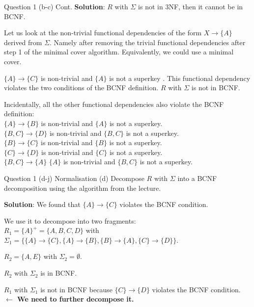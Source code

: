 \begin{frame}[fragile]{Question 1 (b-c) Cont.}
\textbf{Solution}:
$R$ with $\Sigma$ is not in 3NF, then it cannot be in BCNF.\\\vspace{3pt}

Let us look at the non-trivial functional dependencies of the form $X \rightarrow \{A\}$ derived from $\Sigma$. Namely after removing the trivial functional dependencies after step 1 of the minimal cover algorithm. Equivalently, we could use a minimal cover.\\\vspace{3pt}

$\{A\} \rightarrow \{C\}$ is non-trivial and $\{A\}$ is not a superkey . This functional dependency violates the two conditions of the BCNF definition. $R$ with $\Sigma$ is not in BCNF.\\\vspace{3pt}

Incidentally, all the other functional dependencies also violate the BCNF definition:\\
$\{A\} \rightarrow \{B\}$ is non-trivial and $\{A\}$ is not a superkey.\\
$\{B, C\} \rightarrow \{D\}$ is non-trivial and $\{B, C\}$ is not a superkey.\\
$\{B\} \rightarrow \{C\}$ is non-trivial and $\{B\}$ is not a superkey.\\
$\{C\} \rightarrow \{D\}$ is non-trivial and  $\{C\}$ is not a superkey.\\
$\{B, C\} \rightarrow \{A\}$ $\{A\}$ is non-trivial and  $\{B, C\}$ is not a superkey.
\end{frame}

\begin{frame}[fragile]{Question 1 (d-j) Normalisation}
	(d) Decompose $R$ with $\Sigma$ into a BCNF decomposition using the algorithm from the lecture.\\\vspace{5pt}
	
	\textbf{Solution}: We found that $\{A\} \rightarrow \{C\}$ violates the BCNF condition.\\\vspace{3pt}
	
	We use it to decompose into two fragments:\\
	$R_1 = \{A\}^{+} = \{A, B, C, D\}$ with $\Sigma_1 = \{\{A\} \rightarrow \{C\}, \{A\} \rightarrow \{B\},\{B\} \rightarrow \{A\}, \{C\} \rightarrow \{D\}\}$.
	
	$R_2 = \{A, E\}$ with $\Sigma_2 = \emptyset$.
	
	$R_2$ with $\Sigma_2$ is in BCNF.
	
	$R_1$ with $\Sigma_1$ is not in BCNF because $\{C\} \rightarrow \{D\}$ violates the BCNF condition.
	\textbf{$\leftarrow$ We need to further decompose it.}
\end{frame}

